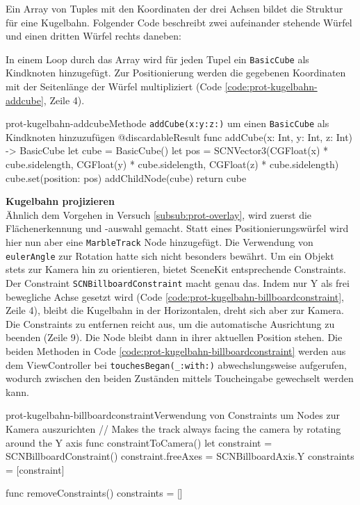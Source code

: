 \begin{description}
	Ein Array von Tuples mit den Koordinaten der drei Achsen bildet die Struktur für eine Kugelbahn. Folgender Code beschreibt zwei aufeinander stehende Würfel und einen dritten Würfel rechts daneben:

	In einem Loop durch das Array wird für jeden Tupel ein \texttt{BasicCube} als Kindknoten hinzugefügt. Zur Positionierung werden die gegebenen Koordinaten mit der Seitenlänge der Würfel multipliziert (Code \ref{code:prot-kugelbahn-addcube}, Zeile 4).

	\begin{code}{prot-kugelbahn-addcube}{Methode \texttt{addCube(x:y:z:)} um einen \texttt{BasicCube} als Kindknoten hinzuzufügen}
		@discardableResult
		func addCube(x: Int, y: Int, z: Int) -> BasicCube {
			let cube = BasicCube()
			let pos = SCNVector3(CGFloat(x) * cube.sidelength, CGFloat(y) * cube.sidelength, CGFloat(z) * cube.sidelength)
			cube.set(position: pos)
			addChildNode(cube)
			return cube
		}
	\end{code}

	\textbf{Kugelbahn projizieren}\\
	Ähnlich dem Vorgehen in Versuch \ref{subsub:prot-overlay}, wird zuerst die Flächenerkennung und -auswahl gemacht. Statt eines Positionierungswürfel wird hier nun aber eine \texttt{MarbleTrack} Node hinzugefügt. Die Verwendung von \texttt{eulerAngle} zur Rotation hatte sich nicht besonders bewährt. Um ein Objekt stets zur Kamera hin zu orientieren, bietet SceneKit entsprechende Constraints. Der Constraint \texttt{SCNBillboardConstraint} macht genau das. Indem nur Y als frei bewegliche Achse gesetzt wird (Code \ref{code:prot-kugelbahn-billboardconstraint}, Zeile 4), bleibt die Kugelbahn in der Horizontalen, dreht sich aber zur Kamera. Die Constraints zu entfernen reicht aus, um die automatische Ausrichtung zu beenden (Zeile 9). Die Node bleibt dann in ihrer aktuellen Position stehen. Die beiden Methoden in Code \ref{code:prot-kugelbahn-billboardconstraint} werden aus dem ViewController bei \texttt{touchesBegan(\_:with:)} abwechslungsweise aufgerufen, wodurch zwischen den beiden Zuständen mittels Toucheingabe gewechselt werden kann.

	\begin{code}{prot-kugelbahn-billboardconstraint}{Verwendung von Constraints um Nodes zur Kamera auszurichten}
		// Makes the track always facing the camera by rotating around the Y axis
		func constraintToCamera() {
			let constraint = SCNBillboardConstraint()
			constraint.freeAxes = SCNBillboardAxis.Y
			constraints = [constraint]
		}
    
		func removeConstraints() {
			constraints = []
		}
	\end{code}


\end{description}
